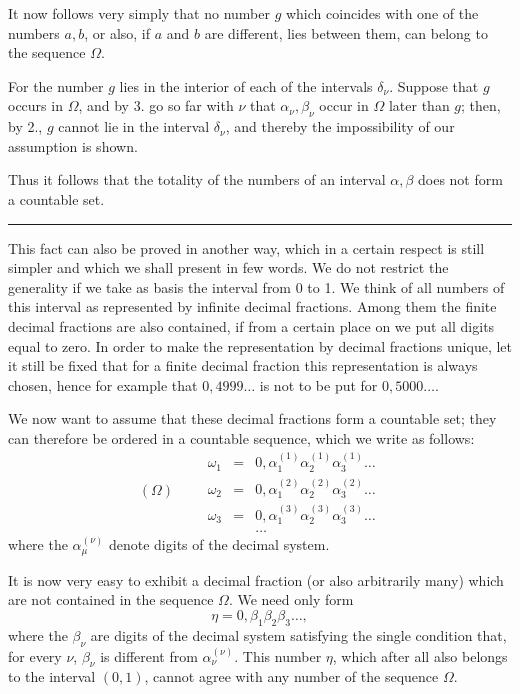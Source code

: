 \documentclass[11pt]{article}
\begin{document}
It now follows very simply that no number $g$ which coincides with one of the numbers $a,b$, or also, if $a$ and $b$ are different, lies between them, can belong to the sequence $\Omega$.

For the number $g$ lies in the interior of each of the intervals $\delta_\nu$. Suppose that $g$ occurs in $\Omega$, and by 3. go so far with $\nu$ that $\alpha_\nu,\beta_\nu$ occur in $\Omega$ later than $g$; then, by 2., $g$ cannot lie in the interval $\delta_\nu$, and thereby the impossibility of our assumption is shown.

Thus it follows that the totality of the numbers of an interval $\alpha,\beta$ does not form a countable set.

\medskip\hrule\medskip

This fact can also be proved in another way, which in a certain respect is still simpler and which we shall present in few words. We do not restrict the generality if we take as basis the interval from 0 to 1. We think of all numbers of this interval as represented by infinite decimal fractions. Among them the finite decimal fractions are also contained, if from a certain place on we put all digits equal to zero. In order to make the representation by decimal fractions unique, let it still be fixed that for a finite decimal fraction this representation is always chosen, hence for example that $0{,}4999\ldots$ is not to be put for $0{,}5000\ldots$.

We now want to assume that these decimal fractions form a countable set; they can therefore be ordered in a countable sequence, which we write as follows:
\[
(\Omega)\qquad
\begin{array}{rcl}
\omega_1&=&0,\alpha_1^{(1)}\alpha_2^{(1)}\alpha_3^{(1)}\ldots\\
\omega_2&=&0,\alpha_1^{(2)}\alpha_2^{(2)}\alpha_3^{(2)}\ldots\\
\omega_3&=&0,\alpha_1^{(3)}\alpha_2^{(3)}\alpha_3^{(3)}\ldots\\
&&\ldots
\end{array}
\]
where the $\alpha_\mu^{(\nu)}$ denote digits of the decimal system.

It is now very easy to exhibit a decimal fraction (or also arbitrarily many) which are not contained in the sequence $\Omega$. We need only form
\[
\eta=0,\beta_1\beta_2\beta_3\ldots,
\]
where the $\beta_\nu$ are digits of the decimal system satisfying the single condition that, for every $\nu$, $\beta_\nu$ is different from $\alpha_\nu^{(\nu)}$.
This number $\eta$, which after all also belongs to the interval $(0,1)$, cannot agree with any number of the sequence $\Omega$.
\end{document}

